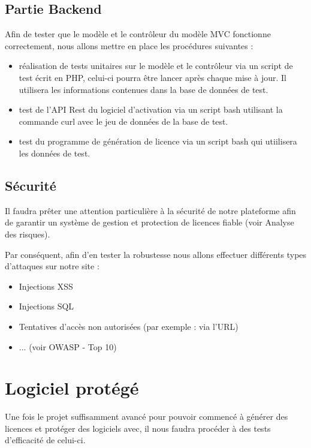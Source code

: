 \subsection{Partie Backend}

Afin de tester que le modèle et le contrôleur du modèle MVC fonctionne correctement, 
nous allons mettre en place les procédures suivantes :
\begin{itemize}
    \item réalisation de tests unitaires sur le modèle et le contrôleur via 
          un script de test écrit en PHP, celui-ci pourra être lancer après 
          chaque mise à jour. Il utilisera les informations contenues dans la  
          base de données de test.
        
    \item test de l'API Rest du logiciel d'activation via un script bash 
          utilisant la commande curl avec le jeu de données de la base de test.
        
    \item test du programme de génération de licence via un script bash qui
          utiilisera les données de test.
\end{itemize}

\subsection{Sécurité}
Il faudra prêter une attention particulière à la sécurité de notre plateforme afin de garantir un système
de gestion et protection de licences fiable (voir Analyse des risques).

Par conséquent, afin d'en tester la robustesse nous allons effectuer différents types d'attaques sur notre site :
\begin{itemize}
    \item Injections XSS
    \item Injections SQL
    \item Tentatives d'accès non autorisées (par exemple : via l'URL)
    \item ... (voir OWASP - Top 10)
\end{itemize}


\section{Logiciel protégé}

Une fois le projet suffisamment avancé pour pouvoir commencé à générer des licences et protéger des logiciels
avec, il nous faudra procéder à des tests d'efficacité de celui-ci.

